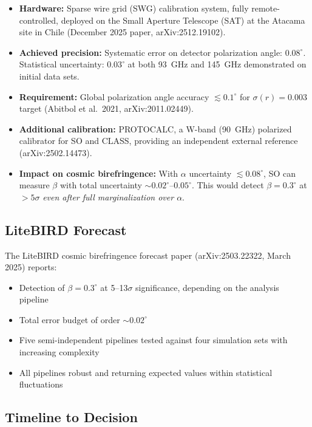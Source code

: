 \documentclass[11pt]{article}
\begin{document}
\begin{itemize}
\item \textbf{Hardware:} Sparse wire grid (SWG) calibration system,
  fully remote-controlled, deployed on the Small Aperture Telescope
  (SAT) at the Atacama site in Chile (December 2025 paper,
  arXiv:2512.19102).

\item \textbf{Achieved precision:} Systematic error on detector
  polarization angle: $0.08^\circ$.  Statistical uncertainty:
  $0.03^\circ$ at both 93~GHz and 145~GHz demonstrated on initial
  data sets.

\item \textbf{Requirement:} Global polarization angle accuracy
  $\lesssim 0.1^\circ$ for $\sigma(r) = 0.003$ target (Abitbol
  et al.\ 2021, arXiv:2011.02449).

\item \textbf{Additional calibration:} PROTOCALC, a W-band (90~GHz)
  polarized calibrator for SO and CLASS, providing an independent
  external reference (arXiv:2502.14473).

\item \textbf{Impact on cosmic birefringence:} With $\alpha$
  uncertainty $\lesssim 0.08^\circ$, SO can measure $\beta$ with
  total uncertainty $\sim 0.02^\circ$--$0.05^\circ$.  This would
  detect $\beta = 0.3^\circ$ at $>5\sigma$ \emph{even after full
  marginalization over $\alpha$}.
\end{itemize}

\subsection{LiteBIRD Forecast}

The LiteBIRD cosmic birefringence forecast paper (arXiv:2503.22322,
March 2025) reports:
\begin{itemize}
\item Detection of $\beta = 0.3^\circ$ at 5--13$\sigma$ significance,
  depending on the analysis pipeline
\item Total error budget of order $\sim 0.02^\circ$
\item Five semi-independent pipelines tested against four simulation
  sets with increasing complexity
\item All pipelines robust and returning expected values within
  statistical fluctuations
\end{itemize}

\subsection{Timeline to Decision}
\end{document}
